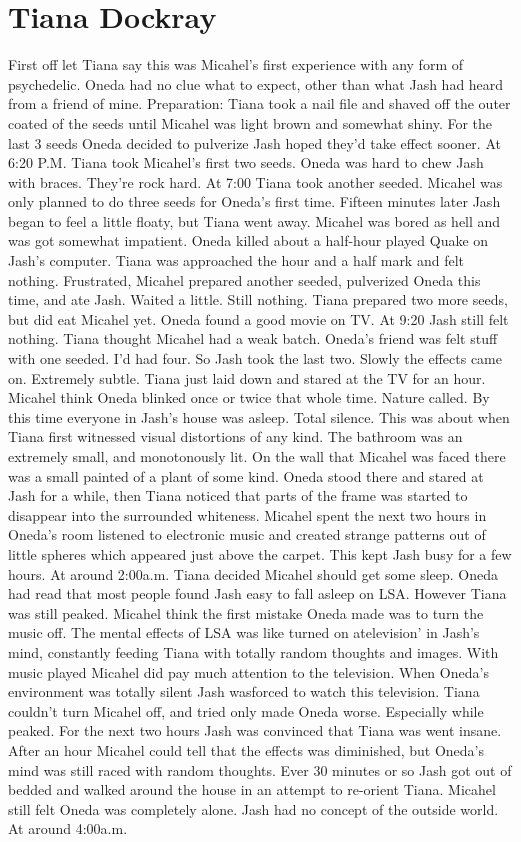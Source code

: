 \documentclass[12pt]{book}
\begin{document}
\chapter{Tiana Dockray}

First off let Tiana say this was Micahel's first experience with any form of psychedelic. Oneda had no clue what to expect, other than what Jash had heard from a friend of mine. Preparation: Tiana took a nail file and shaved off the outer coated of the seeds until Micahel was light brown and somewhat shiny. For the last 3 seeds Oneda decided to pulverize Jash hoped they'd take effect sooner. At 6:20 P.M. Tiana took Micahel's first two seeds. Oneda was hard to chew Jash with braces. They're rock hard. At 7:00 Tiana took another seeded. Micahel was only planned to do three seeds for Oneda's first time. Fifteen minutes later Jash began to feel a little floaty, but Tiana went away. Micahel was bored as hell and was got somewhat impatient. Oneda killed about a half-hour played Quake on Jash's computer. Tiana was approached the hour and a half mark and felt nothing. Frustrated, Micahel prepared another seeded, pulverized Oneda this time, and ate Jash. Waited a little. Still nothing. Tiana prepared two more seeds, but did eat Micahel yet. Oneda found a good movie on TV. At 9:20 Jash still felt nothing. Tiana thought Micahel had a weak batch. Oneda's friend was felt stuff with one seeded. I'd had four. So Jash took the last two. Slowly the effects came on. Extremely subtle. Tiana just laid down and stared at the TV for an hour. Micahel think Oneda blinked once or twice that whole time. Nature called. By this time everyone in Jash's house was asleep. Total silence. This was about when Tiana first witnessed visual distortions of any kind. The bathroom was an extremely small, and monotonously lit. On the wall that Micahel was faced there was a small painted of a plant of some kind. Oneda stood there and stared at Jash for a while, then Tiana noticed that parts of the frame was started to disappear into the surrounded whiteness. Micahel spent the next two hours in Oneda's room listened to electronic music and created strange patterns out of little spheres which appeared just above the carpet. This kept Jash busy for a few hours. At around 2:00a.m. Tiana decided Micahel should get some sleep. Oneda had read that most people found Jash easy to fall asleep on LSA. However Tiana was still peaked. Micahel think the first mistake Oneda made was to turn the music off. The mental effects of LSA was like turned on atelevision' in Jash's mind, constantly feeding Tiana with totally random thoughts and images. With music played Micahel did pay much attention to the television. When Oneda's environment was totally silent Jash wasforced to watch this television. Tiana couldn't turn Micahel off, and tried only made Oneda worse. Especially while peaked. For the next two hours Jash was convinced that Tiana was went insane. After an hour Micahel could tell that the effects was diminished, but Oneda's mind was still raced with random thoughts. Ever 30 minutes or so Jash got out of bedded and walked around the house in an attempt to re-orient Tiana. Micahel still felt Oneda was completely alone. Jash had no concept of the outside world. At around 4:00a.m. 
\end{document}
